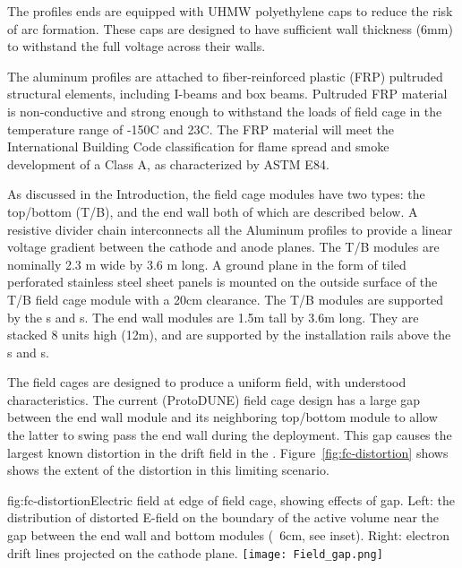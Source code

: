 The profiles ends are equipped with UHMW polyethylene caps to reduce the risk of arc formation.  These caps are designed to have sufficient wall thickness (6mm) to withstand the full voltage across their walls.

The aluminum profiles are attached to fiber-reinforced plastic (FRP) pultruded structural elements, including I-beams and box beams.  
Pultruded FRP material is non-conductive and strong enough to withstand the loads of field cage in the temperature range of -150C and 23C.
The FRP material will meet the International Building Code classification for flame spread and smoke development of a Class A, as characterized by ASTM E84.  


As discussed in the Introduction, the field cage modules have two types: the top/bottom (T/B), and the end wall both of which are described below. 
A resistive divider chain interconnects all the Aluminum profiles to provide a linear voltage gradient between the cathode and anode planes.  The T/B modules are nominally 2.3 m wide by 3.6 m long. A ground plane in the form of tiled perforated stainless steel sheet panels is mounted on the outside surface of the T/B field cage module with a 20cm clearance. The T/B modules are supported by the s and s. The end wall modules are 1.5m tall by 3.6m long. They are stacked 8 units high (12m), and are supported by the installation rails above the s and s.

The field cages are designed to produce a uniform field, with understood characteristics.
The current (ProtoDUNE) field cage design has a large gap between the end wall module and its neighboring top/bottom module to allow the latter to swing pass the end wall during the  deployment. This gap causes the largest known distortion in the drift field in the . Figure~\ref{fig:fc-distortion} shows shows the extent of the distortion in this limiting scenario.

\begin{dunefigure}{fig:fc-distortion}{Electric field at edge of field cage, showing effects of gap. Left: the distribution of distorted E-field on the boundary of the active volume near the gap between the end wall and bottom  modules (~6cm, see inset).  Right: electron drift lines projected on the cathode plane. }
\texttt{[image: Field\_gap.png]}
\end{dunefigure}

